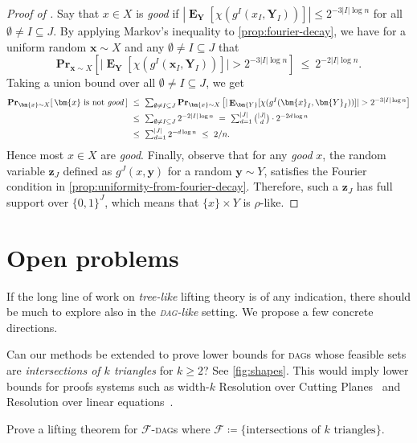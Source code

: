 \documentclass{toc}
\renewcommand{\Pr}{\mathbf{Pr}}
\DeclareMathOperator{\Ex}{\mathbf{E}}
\newcommand{\DAG}{\textsc{dag}}
\newcommand{\DAGs}{\textsc{dag}s\xspace}
\newcommand{\x}{\bm{x}}
\newcommand{\y}{\bm{y}}
\newcommand{\z}{\bm{z}}
\newcommand{\Y}{\bm{Y}}
\newcommand{\calF}{\mathcal{F}}
\newcommand{\bit}{\{0,1\}}
\begin{document}
\begin{proof}[Proof of {}]
Say that $x \in X$ is \emph{good} if $|\Ex_{\Y}[\chi(g^I(x_I,\Y_I))]| \le 2^{-3 |I| \log n}$ for all $\emptyset\neq I \subseteq J$. By applying Markov's inequality to \autoref{prop:fourier-decay}, we have for a uniform random $\x \sim X$ and any $\emptyset\neq I \subseteq J$ that
\[
\Pr_{\x \sim X} \left [ \big|\Ex_{\Y}[\chi(g^I(\x_I,\Y_I))]\big| > 2^{-3 |I| \log n} \right ]~\le~2^{-2 |I| \log n}.
\]
Taking a union bound over all $\emptyset\neq I\subseteq J$, we get
\begin{align*}
	\textstyle \Pr_{\x \sim X}[\,\x \text{ is not \emph{good}}\,]
	~&\textstyle \le~ \sum_{\emptyset \ne I \subseteq J}\Pr_{\x \sim X} \left [ |\Ex_{\Y}[\chi(g^I(\x_I,\Y_I))]| > 2^{-3 |I| \log n} \right ]\\
	~&\textstyle \le~ \sum_{\emptyset \ne I \subseteq J} 2^{-2 |I| \log n}
	~=~ \sum_{d=1}^{|J|} \binom{|J|}{d} \cdot 2^{-2d \log n}\\
	~&\textstyle \le~ \sum_{d=1}^{|J|} 2^{-d \log n}
	~\le~ 2/n.
\end{align*}
Hence most $x \in X$ are \emph{good}. Finally, observe that for any \emph{good} $x$, the random variable $\z_J$ defined as $g^J(x,\y)$ for a random $\y \sim Y$, satisfies the Fourier condition in \autoref{prop:uniformity-from-fourier-decay}. Therefore, such a $\z_J$ has full support over $\bit^J$, which means that $\{x\} \times Y$ is $\rho$-like.
\end{proof}

\section{Open problems} \label{sec:open}

If the long line of work on \emph{tree-like} lifting theory is of any indication, there should be much to explore also in the \emph{\DAG-like} setting. We propose a few concrete directions.

Can our methods be extended to prove lower bounds for \DAGs whose feasible sets are \emph{intersections of $k$ triangles} for $k\geq 2$? See \autoref{fig:shapes}. This would imply lower bounds for proofs systems such as width-$k$ Resolution over Cutting Planes~\cite{krajicek98discretely} and Resolution over linear equations~\cite{raz08resolution,itsykson14lower}.
\begin{question}
Prove a lifting theorem for $\calF$-\DAGs where $\calF\coloneqq\{\text{intersections of $k$ triangles}\}$.
\end{question}
\end{document}
